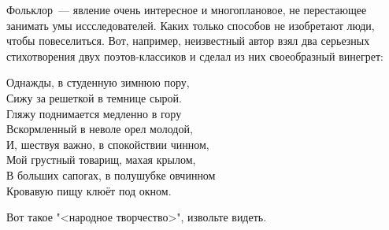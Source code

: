 \documentclass[oneside,final,14pt]{extreport}
\begin{document}
Фольклор~--- явление очень интересное и многоплановое, не
перестающее занимать умы иссследователей. Каких только
способов не изобретают люди, чтобы повеселиться. Вот,
например, неизвестный автор взял два серьезных стихотворения
двух поэтов-классиков и сделал из них своеобразный винегрет:

\bigskip
\noindent Однажды, в студенную зимнюю пору, \\
Сижу за решеткой в темнице сырой. \\
Гляжу поднимается медленно в гору \\
Вскормленный в неволе орел молодой, \\
И, шествуя важно, в спокойствии чинном,\\
Мой грустный товарищ, махая крылом, \\
В больших сапогах, в полушубке овчинном \\
Кровавую пищу клюёт под окном.
\bigskip

Вот такое "<народное творчество>", извольте видеть.
\end{document}
